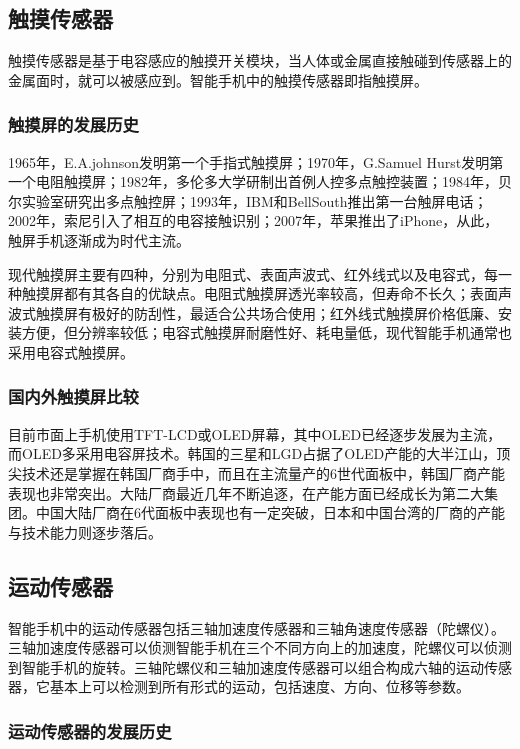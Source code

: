 \documentclass[a4paper,11pt,onecolumn,twoside]{article}
\begin{document}
\begin{multicols}{2}
\subsection{触摸传感器}

触摸传感器是基于电容感应的触摸开关模块，当人体或金属直接触碰到传感器上的金属面时，就可以被感应到。智能手机中的触摸传感器即指触摸屏。

\subsubsection{触摸屏的发展历史}

1965年，E.A.johnson发明第一个手指式触摸屏；1970年，G.Samuel Hurst发明第一个电阻触摸屏；1982年，多伦多大学研制出首例人控多点触控装置；1984年，贝尔实验室研究出多点触控屏；1993年，IBM和BellSouth推出第一台触屏电话；2002年，索尼引入了相互的电容接触识别；2007年，苹果推出了iPhone，从此，触屏手机逐渐成为时代主流。

现代触摸屏主要有四种，分别为电阻式、表面声波式、红外线式以及电容式\cite{touchScreenClassify}，每一种触摸屏都有其各自的优缺点。电阻式触摸屏透光率较高，但寿命不长久；表面声波式触摸屏有极好的防刮性，最适合公共场合使用；红外线式触摸屏价格低廉、安装方便，但分辨率较低；电容式触摸屏耐磨性好、耗电量低，现代智能手机通常也采用电容式触摸屏。

\subsubsection{国内外触摸屏比较}

目前市面上手机使用TFT-LCD或OLED屏幕，其中OLED已经逐步发展为主流，而OLED多采用电容屏技术。韩国的三星和LGD占据了OLED产能的大半江山，顶尖技术还是掌握在韩国厂商手中，而且在主流量产的6世代面板中，韩国厂商产能表现也非常突出。大陆厂商最近几年不断追逐，在产能方面已经成长为第二大集团。中国大陆厂商在6代面板中表现也有一定突破，日本和中国台湾的厂商的产能与技术能力则逐步落后。


\subsection{运动传感器}

智能手机中的运动传感器包括三轴加速度传感器和三轴角速度传感器（陀螺仪）。三轴加速度传感器可以侦测智能手机在三个不同方向上的加速度，陀螺仪可以侦测到智能手机的旋转。三轴陀螺仪和三轴加速度传感器可以组合构成六轴的运动传感器，它基本上可以检测到所有形式的运动，包括速度、方向、位移等参数。

\subsubsection{运动传感器的发展历史}


\end{multicols}
\end{document}
